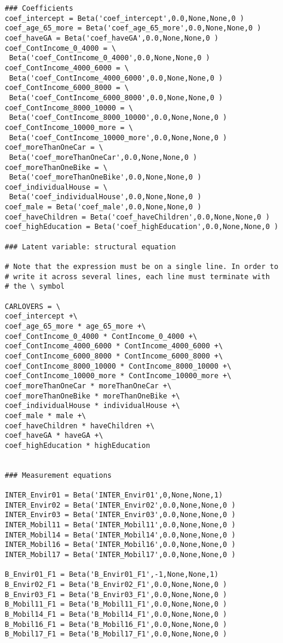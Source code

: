 \documentclass[12pt,a4paper]{article}
\begin{document}
\begin{lstlisting}[style=numbers]
### Coefficients
coef_intercept = Beta('coef_intercept',0.0,None,None,0 )
coef_age_65_more = Beta('coef_age_65_more',0.0,None,None,0 )
coef_haveGA = Beta('coef_haveGA',0.0,None,None,0 )
coef_ContIncome_0_4000 = \
 Beta('coef_ContIncome_0_4000',0.0,None,None,0 )
coef_ContIncome_4000_6000 = \
 Beta('coef_ContIncome_4000_6000',0.0,None,None,0 )
coef_ContIncome_6000_8000 = \
 Beta('coef_ContIncome_6000_8000',0.0,None,None,0 )
coef_ContIncome_8000_10000 = \
 Beta('coef_ContIncome_8000_10000',0.0,None,None,0 )
coef_ContIncome_10000_more = \
 Beta('coef_ContIncome_10000_more',0.0,None,None,0 )
coef_moreThanOneCar = \
 Beta('coef_moreThanOneCar',0.0,None,None,0 )
coef_moreThanOneBike = \
 Beta('coef_moreThanOneBike',0.0,None,None,0 )
coef_individualHouse = \
 Beta('coef_individualHouse',0.0,None,None,0 )
coef_male = Beta('coef_male',0.0,None,None,0 )
coef_haveChildren = Beta('coef_haveChildren',0.0,None,None,0 )
coef_highEducation = Beta('coef_highEducation',0.0,None,None,0 )

### Latent variable: structural equation

# Note that the expression must be on a single line. In order to 
# write it across several lines, each line must terminate with 
# the \ symbol

CARLOVERS = \
coef_intercept +\
coef_age_65_more * age_65_more +\
coef_ContIncome_0_4000 * ContIncome_0_4000 +\
coef_ContIncome_4000_6000 * ContIncome_4000_6000 +\
coef_ContIncome_6000_8000 * ContIncome_6000_8000 +\
coef_ContIncome_8000_10000 * ContIncome_8000_10000 +\
coef_ContIncome_10000_more * ContIncome_10000_more +\
coef_moreThanOneCar * moreThanOneCar +\
coef_moreThanOneBike * moreThanOneBike +\
coef_individualHouse * individualHouse +\
coef_male * male +\
coef_haveChildren * haveChildren +\
coef_haveGA * haveGA +\
coef_highEducation * highEducation


### Measurement equations

INTER_Envir01 = Beta('INTER_Envir01',0,None,None,1)
INTER_Envir02 = Beta('INTER_Envir02',0.0,None,None,0 )
INTER_Envir03 = Beta('INTER_Envir03',0.0,None,None,0 )
INTER_Mobil11 = Beta('INTER_Mobil11',0.0,None,None,0 )
INTER_Mobil14 = Beta('INTER_Mobil14',0.0,None,None,0 )
INTER_Mobil16 = Beta('INTER_Mobil16',0.0,None,None,0 )
INTER_Mobil17 = Beta('INTER_Mobil17',0.0,None,None,0 )

B_Envir01_F1 = Beta('B_Envir01_F1',-1,None,None,1)
B_Envir02_F1 = Beta('B_Envir02_F1',0.0,None,None,0 )
B_Envir03_F1 = Beta('B_Envir03_F1',0.0,None,None,0 )
B_Mobil11_F1 = Beta('B_Mobil11_F1',0.0,None,None,0 )
B_Mobil14_F1 = Beta('B_Mobil14_F1',0.0,None,None,0 )
B_Mobil16_F1 = Beta('B_Mobil16_F1',0.0,None,None,0 )
B_Mobil17_F1 = Beta('B_Mobil17_F1',0.0,None,None,0 )




\end{lstlisting}
\end{document}
